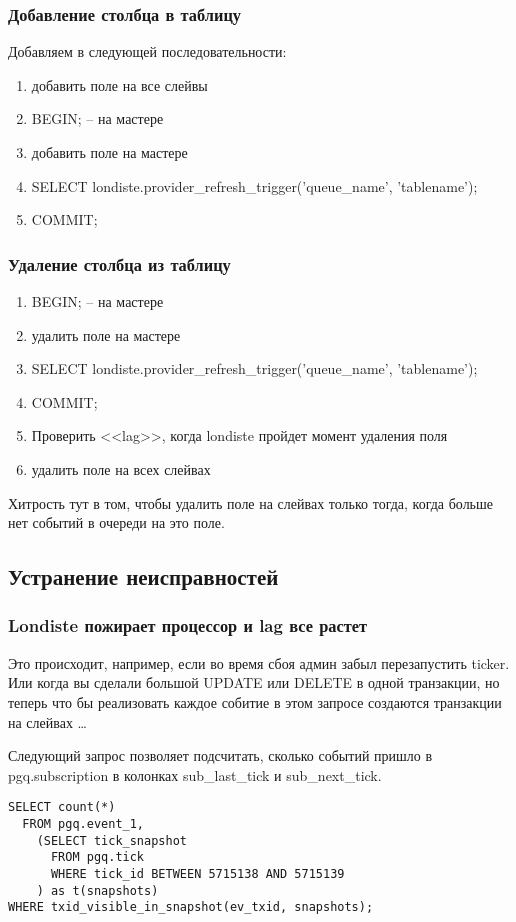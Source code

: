\subsubsection{Добавление столбца в таблицу}
Добавляем в следующей последовательности:
\begin{enumerate}
 \item добавить поле на все слейвы
 \item BEGIN; -- на мастере
 \item добавить поле на мастере
 \item SELECT londiste.provider\_refresh\_trigger('queue\_name', 'tablename');
 \item COMMIT;
\end{enumerate}

\subsubsection{Удаление столбца из таблицу}
\begin{enumerate}
 \item BEGIN; -- на мастере
 \item удалить поле на мастере
 \item SELECT londiste.provider\_refresh\_trigger('queue\_name', 'tablename');
 \item COMMIT;
 \item Проверить <<lag>>, когда londiste пройдет момент удаления поля
 \item удалить поле на всех слейвах
\end{enumerate}

Хитрость тут в том, чтобы удалить поле на слейвах только тогда, когда больше нет событий в очереди на это поле.


\subsection{Устранение неисправностей}

\subsubsection{Londiste пожирает процессор и lag все растет}
Это происходит, например, если во время сбоя админ забыл перезапустить ticker. Или когда вы сделали большой 
UPDATE или DELETE в одной транзакции, но теперь что бы реализовать каждое собитие в этом запросе создаются 
транзакции на слейвах \dots

Следующий запрос позволяет подсчитать, сколько событий пришло в pgq.subscription в колонках sub\_last\_tick и sub\_next\_tick.
\begin{verbatim}
SELECT count(*)
  FROM pgq.event_1,
    (SELECT tick_snapshot
      FROM pgq.tick
      WHERE tick_id BETWEEN 5715138 AND 5715139
    ) as t(snapshots)
WHERE txid_visible_in_snapshot(ev_txid, snapshots);
\end{verbatim}

